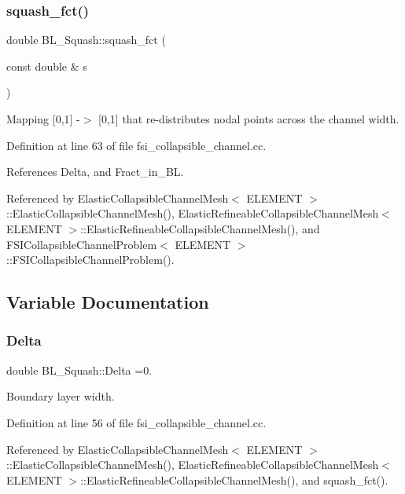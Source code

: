 \subsubsection{\texorpdfstring{squash\+\_\+fct()}{squash\_fct()}}
{\footnotesize\ttfamily double B\+L\+\_\+\+Squash\+::squash\+\_\+fct (\begin{DoxyParamCaption}\item[{const double \&}]{s }\end{DoxyParamCaption})}



Mapping \mbox{[}0,1\mbox{]} -\/$>$ \mbox{[}0,1\mbox{]} that re-\/distributes nodal points across the channel width. 



Definition at line 63 of file fsi\+\_\+collapsible\+\_\+channel.\+cc.



References Delta, and Fract\+\_\+in\+\_\+\+BL.



Referenced by Elastic\+Collapsible\+Channel\+Mesh$<$ E\+L\+E\+M\+E\+N\+T $>$\+::\+Elastic\+Collapsible\+Channel\+Mesh(), Elastic\+Refineable\+Collapsible\+Channel\+Mesh$<$ E\+L\+E\+M\+E\+N\+T $>$\+::\+Elastic\+Refineable\+Collapsible\+Channel\+Mesh(), and F\+S\+I\+Collapsible\+Channel\+Problem$<$ E\+L\+E\+M\+E\+N\+T $>$\+::\+F\+S\+I\+Collapsible\+Channel\+Problem().



\subsection{Variable Documentation}
\mbox{\label{namespaceBL__Squash_a3c4183891049bca81f3a011db24fc579}} 
\subsubsection{\texorpdfstring{Delta}{Delta}}
{\footnotesize\ttfamily double B\+L\+\_\+\+Squash\+::\+Delta =0.}



Boundary layer width. 



Definition at line 56 of file fsi\+\_\+collapsible\+\_\+channel.\+cc.



Referenced by Elastic\+Collapsible\+Channel\+Mesh$<$ E\+L\+E\+M\+E\+N\+T $>$\+::\+Elastic\+Collapsible\+Channel\+Mesh(), Elastic\+Refineable\+Collapsible\+Channel\+Mesh$<$ E\+L\+E\+M\+E\+N\+T $>$\+::\+Elastic\+Refineable\+Collapsible\+Channel\+Mesh(), and squash\+\_\+fct().

